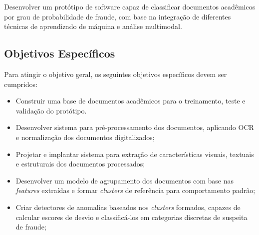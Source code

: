Desenvolver um protótipo de software capaz de classificar documentos acadêmicos por grau de probabilidade de fraude, com base na integração de diferentes técnicas de aprendizado de máquina e análise multimodal.

\subsection{Objetivos Específicos}

Para atingir o objetivo geral, os seguintes objetivos específicos devem ser cumpridos:

\begin{itemize}
    \item Construir uma base de documentos acadêmicos para o treinamento, teste e validação do protótipo.
    \item Desenvolver sistema para pré-processamento dos documentos, aplicando OCR e normalização dos documentos digitalizados;
    \item Projetar e implantar sistema para extração de características visuais, textuais e estruturais dos documentos processados;
    \item Desenvolver um modelo de agrupamento dos documentos com base nas \textit{features} extraídas e formar \textit{clusters} de referência para comportamento padrão;
    \item Criar detectores de anomalias baseados nos \textit{clusters} formados, capazes de calcular escores de desvio e classificá-los em categorias discretas de suspeita de fraude;
\end{itemize}
